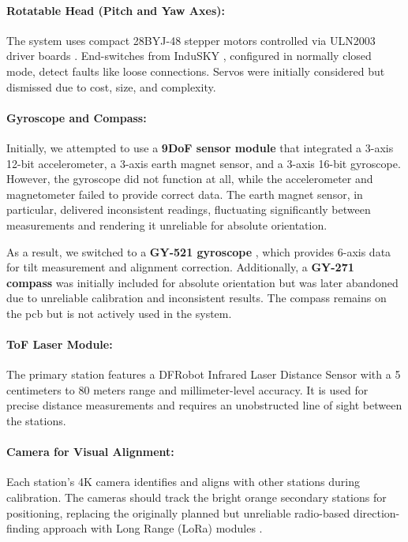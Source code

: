 \paragraph{Rotatable Head (Pitch and Yaw Axes):}
The system uses compact 28BYJ-48 stepper motors controlled via ULN2003 driver boards \cite{angeek_28byj_48}. End-switches from InduSKY \cite{indusky_microswitch}, configured in normally closed mode, detect faults like loose connections. Servos \cite{miuzei_servos} were initially considered but dismissed due to cost, size, and complexity.

\paragraph{Gyroscope and Compass:}

Initially, we attempted to use a \textbf{9DoF sensor module} \citep{jwbl_dof_sensor} that integrated a 3-axis 12-bit accelerometer, a 3-axis earth magnet sensor, and a 3-axis 16-bit gyroscope. However, the gyroscope did not function at all, while the accelerometer and magnetometer failed to provide correct data. The earth magnet sensor, in particular, delivered inconsistent readings, fluctuating significantly between measurements and rendering it unreliable for absolute orientation.

As a result, we switched to a \textbf{GY-521 gyroscope} \cite{azdelivery_gy_521}, which provides 6-axis data for tilt measurement and alignment correction. Additionally, a \textbf{GY-271 compass} \cite{azdelivery_gy_271} was initially included for absolute orientation but was later abandoned due to unreliable calibration and inconsistent results. The compass remains on the \acrshort{pcb} but is not actively used in the system.

\paragraph{ToF Laser Module:}
The primary station features a DFRobot Infrared Laser Distance Sensor \cite{dfrobot_ir_sensor} with a 5 centimeters to 80 meters range and millimeter-level accuracy. It is used for precise distance measurements and requires an unobstructed line of sight between the stations.

\paragraph{Camera for Visual Alignment:}
Each station’s 4K camera \cite{armsom_camera_module} identifies and aligns with other stations during calibration. The cameras should track the bright orange secondary stations for positioning, replacing the originally planned but unreliable radio-based direction-finding approach with Long Range (LoRa) modules \cite{tecnoio_lora_modules}.

